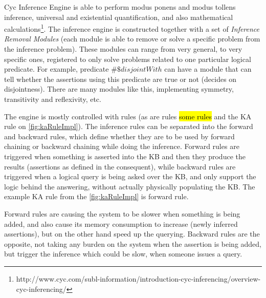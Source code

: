Cyc Inference Engine is able to perform modus ponens and modus tollens 
inference, universal and existential quantification, and also mathematical 
calculations\footnote{http://www.cyc.com/subl-information/introduction-cyc-inferencing/overview-cyc-inferencing/}. The inference engine is constructed together
with a set of \emph{Inference Removal Modules} (each module is able to remove or
solve a specific problem from the inference problem). These modules can range
from very general, to very specific ones, registered to only solve problems
related to one particular logical predicate. For example, predicate 
$\#\$disjointWith$ can have a module that can tell whether the assertions using
this predicate are true or not (decides on disjointness). There are many
modules like this, implementing symmetry, transitivity and reflexivity, etc.

The engine is mostly controlled with rules (as are rules \hl{some rules} and
the KA rule on \autoref{fig:kaRuleImpl}). The inference rules can be separated
into the forward and backward rules, which define whether they are to be used
by forward chaining or backward chaining while doing the inference. Forward
rules are triggered when something is asserted into the KB and then they produce
the results (assertions as defined in the consequent), while backward rules
are triggered when a logical query is being asked over the KB, and only support
the logic behind the answering, without actually physically populating the KB.
The example KA rule from the \autoref{fig:kaRuleImpl} is forward rule. 

Forward rules are causing the system to be slower when something is being added,
and also cause its memory consumption to increase (newly inferred assertions),
but on the other hand speed up the querying. Backward rules are the opposite,
not taking any burden on the system when the assertion is being added, but
trigger the inference which could be slow, when someone issues a query.

